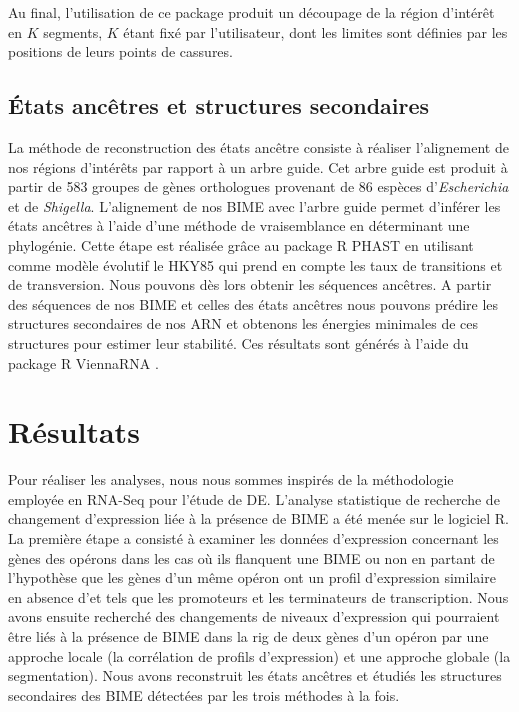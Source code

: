 \documentclass[12pt,a4paper]{report}
\begin{document}
\begin{onehalfspace}
Au final, l'utilisation de ce package produit un découpage de la région d'intérêt en $K$ segments, $K$ étant fixé par l'utilisateur, dont les limites sont définies par les positions de leurs points de cassures.

\section*{États ancêtres et structures secondaires}
La méthode de reconstruction des états ancêtre consiste à réaliser l'alignement de nos régions d'intérêts par rapport à un arbre guide. Cet arbre guide est produit à partir de 583 groupes de gènes orthologues provenant de 86 espèces d'\textit{Escherichia} et de \textit{Shigella}. L'alignement de nos BIME avec l'arbre guide permet d'inférer les états ancêtres à l'aide d'une méthode de vraisemblance en déterminant une phylogénie. Cette étape est réalisée grâce au package R PHAST \citep{Hubisz2011} en utilisant comme modèle évolutif le HKY85 qui prend en compte les taux de transitions et de transversion. Nous pouvons dès lors obtenir les séquences ancêtres. A partir des séquences de nos BIME et celles des états ancêtres nous pouvons prédire les structures secondaires de nos ARN et obtenons les énergies minimales de ces structures pour estimer leur stabilité. Ces résultats sont générés à l'aide du package R ViennaRNA \citep{Lorenz2011}.

\chapter*{Résultats}

Pour réaliser les analyses, nous nous sommes inspirés de la méthodologie employée en RNA-Seq pour l'étude de DE. L'analyse statistique de recherche de changement d'expression liée à la présence de BIME a été menée sur le logiciel R. La première étape a consisté à examiner les données d'expression concernant les gènes des opérons dans les cas où ils flanquent une BIME ou non en partant de l'hypothèse que les gènes d'un même opéron ont un profil d'expression similaire en absence d'\gls{et} tels que les promoteurs et les terminateurs de transcription. Nous avons ensuite recherché des changements de niveaux d'expression qui pourraient être liés à la présence de BIME dans la \gls{rig} de deux gènes d'un opéron par une approche locale (la corrélation de profils d'expression) et une approche globale (la segmentation). Nous avons reconstruit les états ancêtres et étudiés les structures secondaires des BIME détectées par les trois méthodes à la fois.


\end{onehalfspace}
\end{document}
